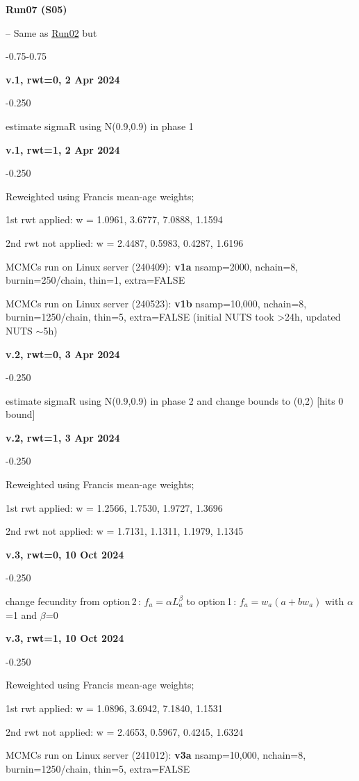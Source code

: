 \hypertarget{R07}{\textbf{Run07 (S05)}} -- Same as \hyperlink{R02}{Run02} but
\begin{itemize_csas}{-0.75}{-0.75}
	\item \textbf{v.1, rwt=0, 2 Apr 2024}
	\begin{itemize_csas}{-0.25}{0}
		\item estimate sigmaR using N(0.9,0.9) in phase 1
	\end{itemize_csas}
	\item \textbf{v.1, rwt=1, 2 Apr 2024}
	\begin{itemize_csas}{-0.25}{0}
		\item Reweighted using Francis mean-age weights;
		\item 1st rwt applied: w = 1.0961, 3.6777, 7.0888, 1.1594
		\item 2nd rwt not applied: w = 2.4487, 0.5983, 0.4287, 1.6196
		\item MCMCs run on Linux server (240409): \textbf{v1a} nsamp=2000, nchain=8, burnin=250/chain, thin=1, extra=FALSE
		\item MCMCs run on Linux server (240523): \textbf{v1b} nsamp=10,000, nchain=8, burnin=1250/chain, thin=5, extra=FALSE (initial NUTS took >24h, updated NUTS $\sim$5h)
	\end{itemize_csas}
	\item \textbf{v.2, rwt=0, 3 Apr 2024}
	\begin{itemize_csas}{-0.25}{0}
		\item estimate sigmaR using N(0.9,0.9) in phase 2 and change bounds to (0,2) [hits 0 bound]
	\end{itemize_csas}
	\item \textbf{v.2, rwt=1, 3 Apr 2024}
	\begin{itemize_csas}{-0.25}{0}
		\item Reweighted using Francis mean-age weights;
		\item 1st rwt applied: w = 1.2566, 1.7530, 1.9727, 1.3696
		\item 2nd rwt not applied: w = 1.7131, 1.1311, 1.1979, 1.1345 
	\end{itemize_csas}
	\item \textbf{v.3, rwt=0, 10 Oct 2024}
	\begin{itemize_csas}{-0.25}{0}
		\item change fecundity from option\,2\,: $f_a = \alpha L_a^{\beta}$ to option\,1\,:  $f_a = w_a (a + b w_a)$ with $\alpha$=1 and $\beta$=0
	\end{itemize_csas}
	\item \textbf{v.3, rwt=1, 10 Oct 2024}
	\begin{itemize_csas}{-0.25}{0}
		\item Reweighted using Francis mean-age weights;
		\item 1st rwt applied: w = 1.0896, 3.6942, 7.1840, 1.1531
		\item 2nd rwt not applied: w = 2.4653, 0.5967, 0.4245, 1.6324 
		\item MCMCs run on Linux server (241012): \textbf{v3a} nsamp=10,000, nchain=8, burnin=1250/chain, thin=5, extra=FALSE
	\end{itemize_csas}
\end{itemize_csas}

